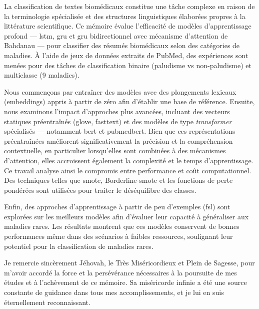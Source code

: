 \documentclass[12pt]{report}
\begin{document}
\newpage
{}
\vspace{1cm}

La classification de textes biomédicaux constitue une tâche complexe en raison de la terminologie spécialisée et des structures linguistiques élaborées propres à la littérature scientifique. Ce mémoire évalue l’efficacité de modèles d’apprentissage profond — \gls{lstm}, \gls{gru} et \gls{gru} bidirectionnel avec mécanisme d’attention de Bahdanau — pour classifier des résumés biomédicaux selon des catégories de maladies. À l’aide de jeux de données extraits de PubMed, des expériences sont menées pour des tâches de classification binaire (paludisme vs non-paludisme) et multiclasse (9 maladies).

Nous commençons par entraîner des modèles avec des plongements lexicaux (embeddings) appris à partir de zéro afin d’établir une base de référence. Ensuite, nous examinons l’impact d’approches plus avancées, incluant des vecteurs statiques préentraînés (\gls{glove}, \gls{fasttext}) et des modèles de type \textit{transformer} spécialisés — notamment \gls{bert} et \gls{pubmedbert}. Bien que ces représentations préentraînées améliorent significativement la précision et la compréhension contextuelle, en particulier lorsqu’elles sont combinées à des mécanismes d’attention, elles accroissent également la complexité et le temps d’apprentissage. Ce travail analyse ainsi le compromis entre performance et coût computationnel. Des techniques telles que \gls{smote}, Borderline-\gls{smote} et les fonctions de perte pondérées sont utilisées pour traiter le déséquilibre des classes.

Enfin, des approches d’apprentissage à partir de peu d’exemples (\gls{fsl}) sont explorées sur les meilleurs modèles afin d’évaluer leur capacité à généraliser aux maladies rares. Les résultats montrent que ces modèles conservent de bonnes performances même dans des scénarios à faibles ressources, soulignant leur potentiel pour la classification de maladies rares.


\newpage
{}
\vspace{1cm}

Je remercie sincèrement Jéhovah, le Très Miséricordieux et Plein de Sagesse, pour m’avoir accordé la force et la persévérance nécessaires à la poursuite de mes études et à l’achèvement de ce mémoire. Sa miséricorde infinie a été une source constante de guidance dans tous mes accomplissements, et je lui en suis éternellement reconnaissant.
\end{document}
